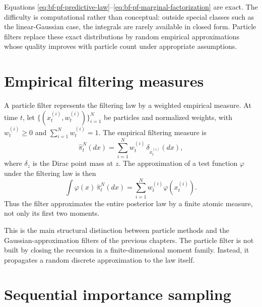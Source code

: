 Equations \eqref{eq:bf-pf-predictive-law}--\eqref{eq:bf-pf-marginal-factorization}
are exact.  The difficulty is computational rather than conceptual: outside
special classes such as the linear-Gaussian case, the integrals are rarely
available in closed form.  Particle filters replace these exact distributions by
random empirical approximations whose quality improves with particle count under
appropriate assumptions.

\section{Empirical filtering measures}
\label{sec:bf-pf-empirical-measures}

A particle filter represents the filtering law by a weighted empirical measure.
At time $t$, let
$\{(x_t^{(i)},w_t^{(i)})\}_{i=1}^N$ be particles and normalized weights, with
$w_t^{(i)}\ge 0$ and $\sum_{i=1}^N w_t^{(i)}=1$.  The empirical filtering
measure is
\begin{equation}
\label{eq:bf-pf-empirical-measure}
  \hat\pi_t^N(dx)
  = \sum_{i=1}^N w_t^{(i)}\,\delta_{x_t^{(i)}}(dx),
\end{equation}
where $\delta_z$ is the Dirac point mass at $z$.  The approximation of a test
function $\varphi$ under the filtering law is then
\begin{equation}
\label{eq:bf-pf-test-function-approx}
  \int \varphi(x)\,\hat\pi_t^N(dx)
  = \sum_{i=1}^N w_t^{(i)}\varphi(x_t^{(i)}).
\end{equation}
Thus the filter approximates the entire posterior law by a finite atomic
measure, not only its first two moments.

This is the main structural distinction between particle methods and the
Gaussian-approximation filters of the previous chapters.  The particle filter is
not built by closing the recursion in a finite-dimensional moment family.
Instead, it propagates a random discrete approximation to the law itself.

\section{Sequential importance sampling}
\label{sec:bf-pf-sis}

